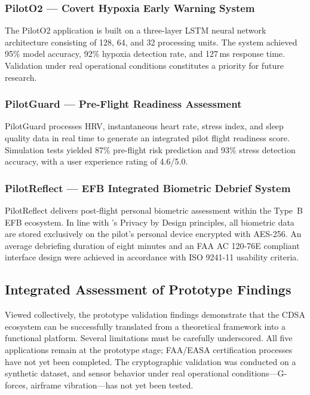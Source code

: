 \documentclass[12pt,a4paper]{article}
\begin{document}
\subsubsection{PilotO2 --- Covert Hypoxia Early Warning System}
The PilotO2 application is built on a three-layer LSTM neural network architecture consisting
of 128, 64, and 32 processing units. The system achieved 95\% model accuracy, 92\% hypoxia
detection rate, and 127\,ms response time. Validation under real operational conditions
constitutes a priority for future research.

\subsubsection{PilotGuard --- Pre-Flight Readiness Assessment}
PilotGuard processes HRV, instantaneous heart rate, stress index, and sleep quality data in
real time to generate an integrated pilot flight readiness score. Simulation tests yielded
87\% pre-flight risk prediction and 93\% stress detection accuracy, with a user experience
rating of 4.6/5.0.

\subsubsection{PilotReflect --- EFB Integrated Biometric Debrief System}
PilotReflect delivers post-flight personal biometric assessment within the Type~B EFB ecosystem.
In line with \citeauthor{cavoukian2009}'s \citeyearpar{cavoukian2009} Privacy by Design
principles, all biometric data are stored exclusively on the pilot's personal device encrypted
with AES-256. An average debriefing duration of eight minutes and an FAA AC 120-76E compliant
interface design were achieved in accordance with ISO 9241-11 usability criteria.

\subsection{Integrated Assessment of Prototype Findings}

Viewed collectively, the prototype validation findings demonstrate that the CDSA ecosystem can
be successfully translated from a theoretical framework into a functional platform. Several
limitations must be carefully underscored. All five applications remain at the prototype stage;
FAA/EASA certification processes have not yet been completed. The cryptographic validation was
conducted on a synthetic dataset, and sensor behavior under real operational conditions---G-forces,
airframe vibration---has not yet been tested.
\end{document}
